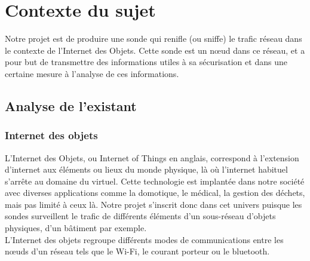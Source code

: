 \chapter{Contexte du sujet}
\label{chap:contexte}
	Notre projet est de produire une sonde qui renifle (ou sniffe) le trafic réseau dans le contexte de l'Internet des Objets. Cette sonde est un nœud dans ce réseau, et a pour but de transmettre des informations utiles à sa sécurisation et dans une certaine mesure à l'analyse de ces informations.

\section{Analyse de l'existant}
	
	\subsection{Internet des objets}
		L'Internet des Objets, ou Internet of Things en anglais, correspond à l'extension d'internet aux éléments ou lieux du monde physique, là où l'internet habituel s'arrête au domaine du virtuel.
		Cette technologie est implantée dans notre société avec diverses applications comme la domotique, le médical, la gestion des déchets, mais pas limité à ceux là.
		Notre projet s'inscrit donc dans cet univers puisque les sondes surveillent le trafic de différents éléments d'un sous-réseau d'objets physiques, d'un bâtiment par exemple. \\
		L'Internet des objets regroupe différents modes de communications entre les nœuds d'un réseau tels que le Wi-Fi, le courant porteur ou le bluetooth.%
		
